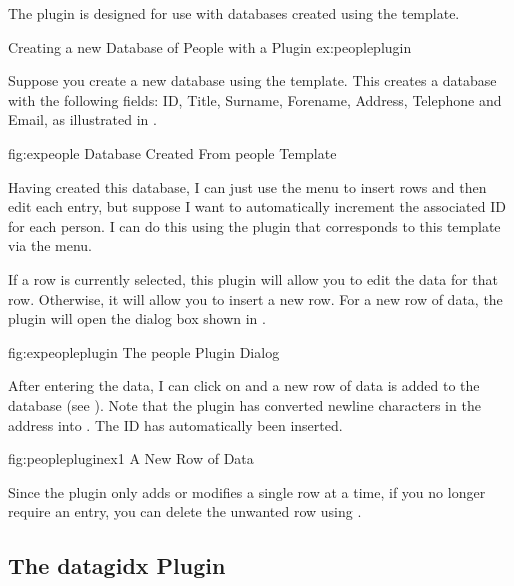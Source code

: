    The  plugin is designed for use with databases created
   using the  template.

\begin{example}
 {Creating a new Database of People with a Plugin}
 {ex:peopleplugin}

   Suppose you create a new database using the 
   template. This creates a database with the following fields:
   ID, Title, Surname, Forename, Address, Telephone and Email, as
   illustrated in .

\FloatFig
 {fig:expeople}
 {%
 }
 {Database Created From people Template}

   Having created this database, I can just use the 
    menu to insert rows and then edit each entry,
   but suppose I want to automatically increment the associated ID
   for each person. I can do this using the  plugin 
   that corresponds to this template via the  menu.

   If a row is currently selected, this plugin will allow you to edit
   the data for that row. Otherwise, it will allow you to insert a new
   row. For a new row of data, the  plugin will open
   the dialog box shown in .

\FloatFig
 {fig:expeopleplugin}
 {%
 }
 {The people Plugin Dialog}

   After entering the data, I can click on 
   and a new row of data is added to the database (see 
   ). Note that the plugin has converted newline
   characters in the address into . The ID has automatically 
   been inserted.

\FloatFig
 {fig:peoplepluginex1}
 {%
 }
 {A New Row of Data}

   Since the  plugin only adds or modifies a single
   row at a time, if you no longer require an entry, you can delete the
   unwanted row using .
\end{example}

\subsection{The datagidx Plugin}\label{sec:datagidxplugin}


